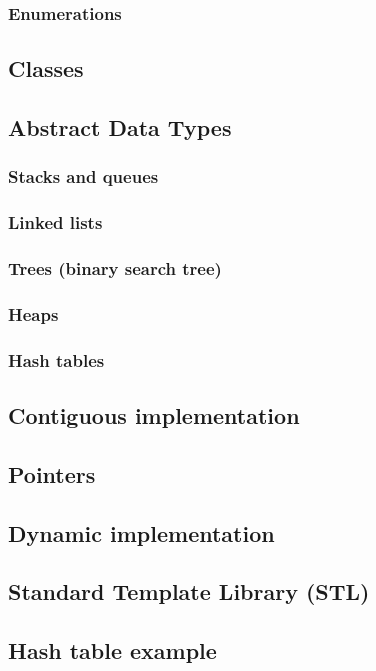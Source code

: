\subsubsection{Enumerations}


\subsection{Classes}




\subsection{Abstract Data Types}

\subsubsection{Stacks and queues}

\subsubsection{Linked lists}

\subsubsection{Trees (binary search tree)}

\subsubsection{Heaps}

\subsubsection{Hash tables}

\subsection{Contiguous implementation}

\subsection{Pointers}

\subsection{Dynamic implementation}

\subsection{Standard Template Library (STL)}

\subsection{Hash table example}